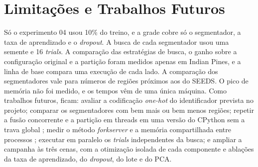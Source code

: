 \section{Limitações e Trabalhos Futuros}

Só o experimento 04 usou 10\% do treino, e a grade cobre só o segmentador, a taxa de aprendizado e o \textit{dropout}. A busca de cada segmentador usou uma semente e 16 \textit{trials}. A comparação das estratégias de busca, o ganho sobre a configuração original e a partição foram medidos apenas em Indian Pines, e a linha de base compara uma execução de cada lado. A comparação dos segmentadores vale para números de regiões próximos aos do SEEDS. O pico de memória não foi medido, e os tempos vêm de uma única máquina. Como trabalhos futuros, ficam: avaliar a codificação \textit{one-hot} do identificador prevista no projeto; comparar os segmentadores com bem mais ou bem menos regiões; repetir a fusão concorrente e a partição em threads em uma versão do CPython sem a trava global \cite{PEP703}; medir o método \textit{forkserver} e a memória compartilhada entre processos \cite{PyTorchMultiprocessing}; executar em paralelo os \textit{trials} independentes da busca; e ampliar a campanha às três cenas, com a otimização isolada de cada componente e ablações da taxa de aprendizado, do \textit{dropout}, do lote e do PCA.
